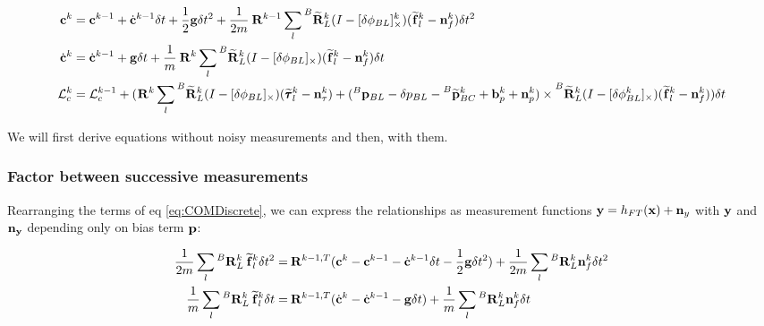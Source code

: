 \documentclass[11pt]{article}
\newcommand{\Rot}[2]{\prescript{#1}{}{\bfR}_{#2}}
\newcommand{\Rotm}[2]{\prescript{#1}{}{\widetilde{\bfR}}_{#2}}
\newcommand{\noise}{\bfn}
\newcommand{\bias}{\bfb}
\newcommand{\posi}[2]{\prescript{#1}{}{\bfp}_{#2}}
\newcommand{\posim}[2]{\prescript{#1}{}{\widetilde{\bfp}}_{#2}}
\newcommand{\forcem}[2]{\prescript{#1}{}{\widetilde{\bff}}_{#2}}
\newcommand{\torquem}[2]{\prescript{#1}{}{\widetilde{\pmb{\tau}}}_{#2}}
\newcommand{\AM}{\mathcal{L}}
\newcommand{\COM}{\bfc}
\newcommand{\COMd}{\dot{\bfc}}
\begin{document}
\begin{small}
\begin{equation}
\begin{split}
\COM^{k} &= \COM^{k-1} + \COMd^{k-1} \delta t 
+ \frac{1}{2} \bfg \delta t^2 + \frac{1}{2m} \Rot{}{}^{k-1} \sum_l \Rotm{B}{L}^k (I - [\delta \phi_{BL}]_{\times}^{k}) (\forcem{}{l}^{k} - \noise_f^{k}) \delta t^2
\\
\COMd^{k}&= \COMd^{k-1} + \bfg \delta t + \frac{1}{m} \Rot{}{}^{k} \sum_l \Rotm{B}{L}^k (I - [\delta \phi_{BL}]_{\times}) (\forcem{}{l}^{k} - \noise_f^{k}) \delta t 
\\
\AM_c^{k} &= \AM_c^{k-1} +  ( 
\Rot{}{}^{k}\sum_l \Rotm{B}{L}^k (I - [\delta \phi_{BL}]_{\times}) (\torquem{}{l}^{k} - \noise_{\tau}^{k}) + (\posi{B}{BL} - \delta p_{BL} - \posim{B}{BC}^{k} + \bias_{p}^{k} + \noise_p^{k}) \times \Rotm{B}{L}^k (I - [\delta \phi_{BL}^k]_{\times}) (\forcem{}{l}^{k} - \noise_f^{k}) 
) \delta t
\end{split}
\label{eq:COMDiscrete}
\end{equation}
\end{small}

We will first derive equations without noisy measurements and then, with them.

\subsubsection{Factor between successive measurements}
Rearranging the terms of eq \ref{eq:COMDiscrete}, we can express the relationships as measurement functions $\bfy = h_{FT}(\bfx) + \noise_y$ with ${\bf y}$ and $\noise_{\bfy}$ depending only on bias term ${\bf p}$:

\begin{small}
\begin{equation}
\begin{split}
	\frac{1}{2m}\sum_l \Rot{B}{L}^{k} \forcem{}{l}^{k}\delta t^2 =& 
	\Rot{}{}^{k-1,T}(\COM^{k} - \COM^{k-1} - \COMd^{k-1} \delta t - \frac{1}{2} \bfg \delta t^2)
	+ \frac{1}{2m}\sum_l \Rot{B}{L}^{k} \noise_f^{k}\delta t^2
	\\
	\frac{1}{m} \sum_l \Rot{B}{L}^{k} \forcem{}{l}^{k} \delta t =& \Rot{}{}^{k-1,T}(\COMd^{k} - \COMd^{k-1} - \bfg \delta t) 
	+ \frac{1}{m} \sum_l \Rot{B}{L}^{k} \noise_f^{k} \delta t	
\end{split}
\label{eq:CCdFactor}
\end{equation}
\end{small}
\end{document}
